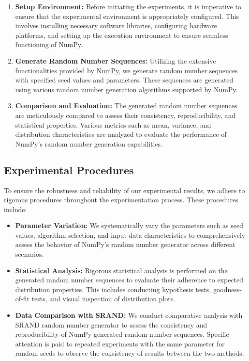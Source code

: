 \documentclass{article}
\begin{document}
\begin{enumerate}
    \item \textbf{Setup Environment:} Before initiating the experiments, it is imperative to ensure that the experimental environment is appropriately configured. This involves installing necessary software libraries, configuring hardware platforms, and setting up the execution environment to ensure seamless functioning of NumPy.
    
    \item \textbf{Generate Random Number Sequences:} Utilizing the extensive functionalities provided by NumPy, we generate random number sequences with specified seed values and parameters. These sequences are generated using various random number generation algorithms supported by NumPy.
    
    \item \textbf{Comparison and Evaluation:} The generated random number sequences are meticulously compared to assess their consistency, reproducibility, and statistical properties. Various metrics such as mean, variance, and distribution characteristics are analyzed to evaluate the performance of NumPy's random number generation capabilities.
\end{enumerate}

\subsection*{Experimental Procedures}

To ensure the robustness and reliability of our experimental results, we adhere to rigorous procedures throughout the experimentation process. These procedures include:

\begin{itemize}
    \item \textbf{Parameter Variation:} We systematically vary the parameters such as seed values, algorithm selection, and input data characteristics to comprehensively assess the behavior of NumPy's random number generator across different scenarios.
    
    \item \textbf{Statistical Analysis:} Rigorous statistical analysis is performed on the generated random number sequences to evaluate their adherence to expected distribution properties. This includes conducting hypothesis tests, goodness-of-fit tests, and visual inspection of distribution plots.
    
    \item \textbf{Data Comparison with SRAND:} We conduct comparative analysis with SRAND random number generator to assess the consistency and reproducibility of NumPy-generated random number sequences. Specific attention is paid to repeated experiments with the same parameter for random seeds to observe the consistency of results between the two methods.
\end{itemize}
\end{document}

